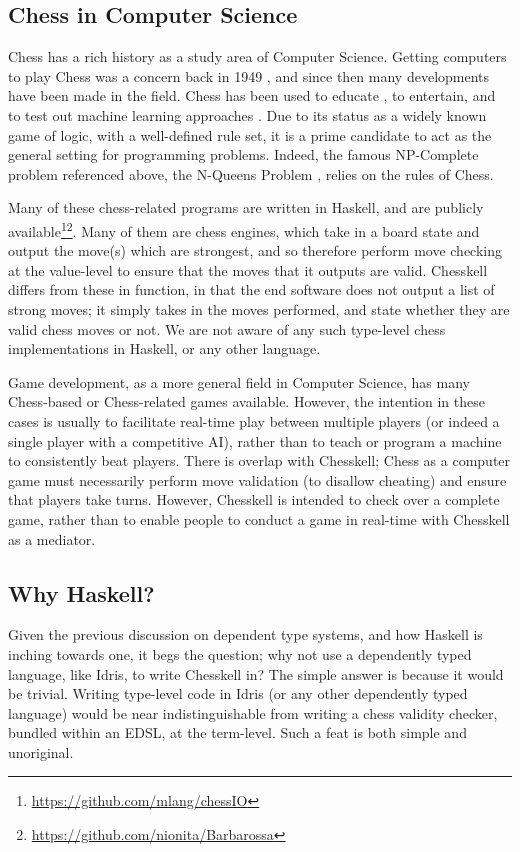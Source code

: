 \documentclass[12pt, a4paper, bibliography=totocnumbered]{scrreprt}
\begin{document}
\subsection{Chess in Computer Science}

Chess has a rich history as a study area of Computer Science. Getting computers to play Chess was a concern back in 1949 \cite{1949chess}, and since then many developments have been made in the field. Chess has been used to educate \cite{chesseducation}, to entertain, and to test out machine learning approaches \cite{chessml}. Due to its status as a widely known game of logic, with a well-defined rule set, it is a prime candidate to act as the general setting for programming problems. Indeed, the famous NP-Complete problem referenced above, the N-Queens Problem \cite{nqueensnp}, relies on the rules of Chess.

Many of these chess-related programs are written in Haskell, and are publicly available\footnote{\url{https://github.com/mlang/chessIO}}\footnote{\url{https://github.com/nionita/Barbarossa}}. Many of them are chess engines, which take in a board state and output the move(s) which are strongest, and so therefore perform move checking at the value-level to ensure that the moves that it outputs are valid. Chesskell differs from these in function, in that the end software does not output a list of strong moves; it simply takes in the moves performed, and state whether they are valid chess moves or not. We are not aware of any such type-level chess implementations in Haskell, or any other language.

Game development, as a more general field in Computer Science, has many Chess-based or Chess-related games available. However, the intention in these cases is usually to facilitate real-time play between multiple players (or indeed a single player with a competitive AI), rather than to teach or program a machine to consistently beat players. There is overlap with Chesskell; Chess as a computer game must necessarily perform move validation (to disallow cheating) and ensure that players take turns. However, Chesskell is intended to check over a complete game, rather than to enable people to conduct a game in real-time with Chesskell as a mediator.

\subsection{Why Haskell?}

Given the previous discussion on dependent type systems, and how Haskell is inching towards one, it begs the question; why not use a dependently typed language, like Idris, to write Chesskell in? The simple answer is because it would be trivial. Writing type-level code in Idris (or any other dependently typed language) would be near indistinguishable from writing a chess validity checker, bundled within an EDSL, at the term-level. Such a feat is both simple and unoriginal.
\end{document}
